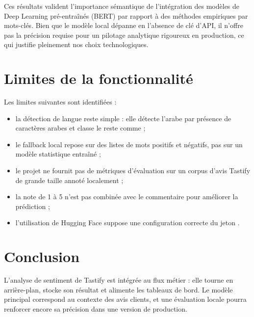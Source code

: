 Ces résultats valident l'importance sémantique de l'intégration des modèles de Deep Learning pré-entraînés (BERT) par rapport à des méthodes empiriques par mots-clés. Bien que le modèle local dépanne en l'absence de clé d'API, il n'offre pas la précision requise pour un pilotage analytique rigoureux en production, ce qui justifie pleinement nos choix technologiques.

\section{Limites de la fonctionnalité}
Les limites suivantes sont identifiées :
\begin{itemize}
  \item la détection de langue reste simple : elle détecte l'arabe par présence de caractères arabes et classe le reste comme  ;
  \item le fallback local repose sur des listes de mots positifs et négatifs, pas sur un modèle statistique entraîné ;
  \item le projet ne fournit pas de métriques d'évaluation sur un corpus d'avis Tastify de grande taille annoté localement ;
  \item la note de 1 à 5 n'est pas combinée avec le commentaire pour améliorer la prédiction ;
  \item l'utilisation de Hugging Face suppose une configuration correcte du jeton .
\end{itemize}

\section*{Conclusion}
L'analyse de sentiment de Tastify est intégrée au flux métier : elle tourne en arrière-plan, stocke son résultat et alimente les tableaux de bord. Le modèle principal correspond au contexte des avis clients, et une évaluation locale pourra renforcer encore sa précision dans une version de production.
